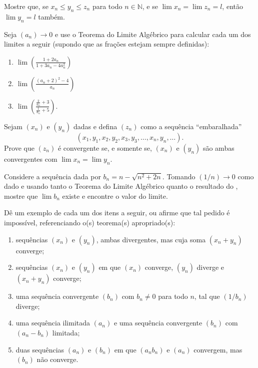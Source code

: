 \begin{exercise}\label{ex:2-3-3}
Mostre que, se $x_n \leq y_n \leq z_n$ para todo $n \in \mathbb{N}$, e se $\lim x_n = \lim z_n = l$, então $\lim y_n = l$ também.
\end{exercise}

\begin{exercise}\label{ex:2-3-4}
Seja $(a_n) \to 0$ e use o Teorema do Limite Algébrico para calcular cada um dos limites a seguir (supondo que as frações estejam sempre definidas):
\begin{enumerate}[label=(\alph*)]
\item $\displaystyle \lim \left( \frac{1 + 2a_n}{1 + 3a_n - 4a_n^2} \right)$
\item $\displaystyle \lim \left( \frac{(a_n + 2)^2 - 4}{a_n} \right)$
\item $\displaystyle \lim \left( \frac{\frac{2}{a_n} + 3}{\frac{1}{a_n} + 5} \right)$.
\end{enumerate}
\end{exercise}

\begin{exercise}\label{ex:2-3-5}
Sejam $(x_n)$ e $(y_n)$ dadas e defina $(z_n)$ como a sequência ``embaralhada''
\[
(x_1, y_1, x_2, y_2, x_3, y_3, \dots, x_n, y_n, \dots).
\]
Prove que $(z_n)$ é convergente se, e somente se, $(x_n)$ e $(y_n)$ são ambas convergentes com $\lim x_n = \lim y_n$.
\end{exercise}

\begin{exercise}\label{ex:2-3-6}
Considere a sequência dada por $b_n = n - \sqrt{n^2 + 2n}$. Tomando $(1/n) \to 0$ como dado e usando tanto o Teorema do Limite Algébrico quanto o resultado do , mostre que $\lim b_n$ existe e encontre o valor do limite.
\end{exercise}

\begin{exercise}\label{ex:2-3-7}
Dê um exemplo de cada um dos itens a seguir, ou afirme que tal pedido é impossível, referenciando o(s) teorema(s) apropriado(s):
\begin{enumerate}[label=(\alph*)]
\item sequências $(x_n)$ e $(y_n)$, ambas divergentes, mas cuja soma $(x_n + y_n)$ converge;
\item sequências $(x_n)$ e $(y_n)$ em que $(x_n)$ converge, $(y_n)$ diverge e $(x_n + y_n)$ converge;
\item uma sequência convergente $(b_n)$ com $b_n \neq 0$ para todo $n$, tal que $(1/b_n)$ diverge;
\item uma sequência ilimitada $(a_n)$ e uma sequência convergente $(b_n)$ com $(a_n - b_n)$ limitada;
\item duas sequências $(a_n)$ e $(b_n)$ em que $(a_n b_n)$ e $(a_n)$ convergem, mas $(b_n)$ não converge.
\end{enumerate}
\end{exercise}

